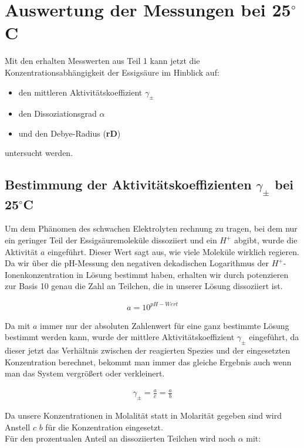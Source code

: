 \section{Auswertung der Messungen bei 25$^\circ$C}

Mit den erhalten Messwerten aus Teil 1 kann jetzt die Konzentrationsabhängigkeit der Essigsäure im Hinblick auf:

\begin{itemize}
    \item den mittleren Aktivitätskoeffizient $\gamma_\pm$
    \item den Dissoziationsgrad $\alpha$
    \item und den Debye-Radius (\textbf{rD})
\end{itemize}

untersucht werden.

\subsection{Bestimmung der Aktivitätskoeffizienten $\gamma_\pm$ bei 25$^\circ$C}

Um dem Phänomen des schwachen Elektrolyten rechnung zu tragen, bei dem nur ein geringer Teil der Essigsäuremoleküle dissoziiert und ein $H^+$ abgibt,
wurde die Aktivität $a$ eingeführt. Dieser Wert sagt aus, wie viele Moleküle wirklich regieren. 
Da wir über die pH-Messung den negativen dekadischen Logarithmus der $H^+$-Ionenkonzentration in Lösung bestimmt haben, erhalten wir durch potenzieren
zur Basis 10 genau die Zahl an Teilchen, die in unserer Lösung dissoziiert ist.

\begin{align}
    a = 10^{pH-Wert}
\end{align} 

Da mit $a$ immer nur der absoluten Zahlenwert für eine ganz bestimmte Lösung bestimmt werden kann, wurde der mittlere Aktivitätskoeffizient $\gamma_\pm$
eingeführt, da dieser jetzt das Verhältnis zwischen der reagierten Spezies und der eingesetzten Konzentration berechnet, bekommt man immer das
gleiche Ergebnis auch wenn man das System vergrößert oder verkleinert.

\begin{align}
    \gamma_\pm = \frac{a}{c} = \frac{a}{b}
\end{align}

Da unsere Konzentrationen in Molalität statt in Molarität gegeben sind wird Anstell $c$ $b$ für die Konzentration eingesetzt. \\
Für den prozentualen Anteil an dissoziierten Teilchen wird noch $\alpha$ mit:

